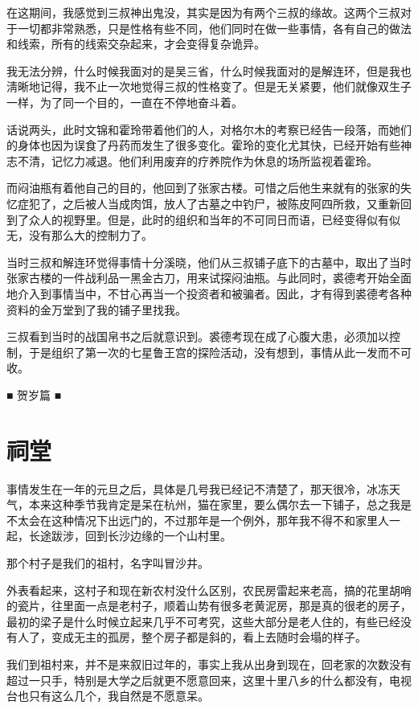 在这期间，我感觉到三叔神出鬼没，其实是因为有两个三叔的缘故。这两个三叔对于一切都非常熟悉，只是性格有些不同，他们同时在做一些事情，各有自己的做法和线索，所有的线索交杂起来，才会变得复杂诡异。

我无法分辨，什么时候我面对的是吴三省，什么时候我面对的是解连环，但是我也淸晰地记得，我不止一次地觉得三叔的性格变了。但是无关紧要，他们就像双生子一样，为了同一个目的，一直在不停地奋斗着。

话说两头，此时文锦和霍玲带着他们的人，对格尔木的考察已经告一段落，而她们的身体也因为误食了丹药而发生了很多变化。霍玲的变化尤其快，已经开始有些神志不清，记忆力减退。他们利用废弃的疗养院作为休息的场所监视着霍玲。

而闷油瓶有着他自己的目的，他回到了张家古楼。可惜之后他生来就有的张家的失忆症犯了，之后被人当成肉饵，放人了古墓之中钓尸，被陈皮阿四所救，又重新回到了众人的视野里。但是，此时的组织和当年的不可同日而语，已经变得似有似无，没有那么大的控制力了。

当时三叔和解连环觉得事情十分溪晓，他们从三叔铺子底下的古墓中，取出了当时张家古楼的一件战利品一黑金古刀，用来试探闷油瓶。与此同时，裘德考开始全面地介入到事情当中，不甘心再当一个投资者和被骗者。因此，才有得到裘德考各种资料的金万堂到了我的铺子里找我。

三叔看到当时的战国帛书之后就意识到。裘德考现在成了心腹大患，必须加以控制，于是组织了第一次的七星鲁王宫的探险活动，没有想到，事情从此一发而不可收。

■ 贺岁篇 ■

\chapter{祠堂}

事情发生在一年的元旦之后，具体是几号我已经记不清楚了，那天很冷，冰冻天气，本来这种季节我肯定是呆在杭州，猫在家里，要么偶尔去一下铺子，总之我是不太会在这种情况下出远门的，不过那年是一个例外，那年我不得不和家里人一起，长途跋涉，回到长沙边缘的一个山村里。

那个村子是我们的祖村，名字叫冒沙井。

外表看起来，这村子和现在新农村没什么区别，农民房雷起来老高，搞的花里胡哨的瓷片，往里面一点是老村子，顺着山势有很多老黄泥房，那是真的很老的房子，最初的梁子是什么时候立起来几乎不可考究，这些大部分是老人住的，有些已经没有人了，变成无主的孤房，整个房子都是斜的，看上去随时会塌的样子。

我们到祖村来，并不是来叙旧过年的，事实上我从出身到现在，回老家的次数没有超过一只手，特别是大学之后就更不愿意回来，这里十里八乡的什么都没有，电视台也只有这么几个，我自然是不愿意呆。

